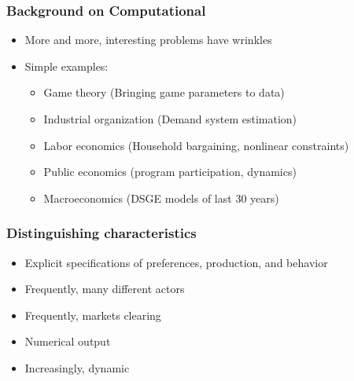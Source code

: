 \documentclass{beamer}
\begin{document}
\begin{frame}
\frametitle[alignment=center]{Background on Computational}
\begin{itemize}
\item More and more, interesting problems have wrinkles
\bigskip
\item Simple examples:
\bigskip
\begin{itemize}
\item Game theory (Bringing game parameters to data)
\bigskip
\item Industrial organization (Demand system estimation)
\bigskip
\item Labor economics (Household bargaining, nonlinear constraints)
\smallskip
\item Public economics (program participation, dynamics)
\bigskip
\item Macroeconomics (DSGE models of last 30 years)
\end{itemize}
\end{itemize}
\end{frame}

\begin{frame}
\frametitle[alignment=center]{Distinguishing characteristics}
\begin{itemize}
\item Explicit specifications of preferences, production, and behavior
\smallskip
\item Frequently, many different actors 
\bigskip
\item Frequently, markets clearing
\bigskip
\item Numerical output
\bigskip
\item Increasingly, dynamic
\end{itemize}
\end{frame}
\end{document}
